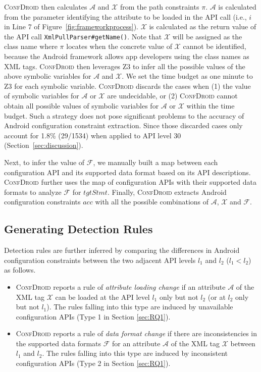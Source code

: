 \textsc{ConfDroid} then calculates $\mathcal{A}$ and $\mathcal{X}$ from the path constraints $\pi$.
$\mathcal{A}$ is calculated from the parameter identifying the attribute to be loaded in the API call (i.e., $i$ in Line 7 of Figure~\ref{fig:frameworkprocess}). 
$\mathcal{X}$ is calculated as the return value of the API call \texttt{XmlPullParser\#getName()}. 
Note that $\mathcal{X}$ will be assigned as the class name where $\pi$ locates when the concrete value of $\mathcal{X}$ cannot be identified, because the Android framework allows app developers using the class names as XML tags.
\textsc{ConfDroid} then leverages Z3 to infer all the possible values of the above symbolic variables for $\mathcal{A}$ and $\mathcal{X}$.
We set the time budget as one minute to Z3 for each symbolic variable.
\textsc{ConfDroid} discards the cases when (1) the value of symbolic variables for $\mathcal{A}$ or $\mathcal{X}$ are undecidable, or (2) \textsc{ConfDroid} cannot obtain all possible values of symbolic variables for $\mathcal{A}$ or $\mathcal{X}$ within the time budget.
Such a strategy does not pose significant problems to the accuracy of Android configuration constraint extraction. Since those discarded cases only account for 1.8\% (29/1534) when applied to API level 30 (Section~\ref{sec:discussion}).

Next, to infer the value of $\mathcal{F}$, we manually built a map between each configuration API and its supported data format based on its API descriptions. \textsc{ConfDroid} further uses the map of configuration APIs with their supported data formats to analyze $\mathcal{F}$ for $tgtStmt$.
Finally, \textsc{ConfDroid} extracts Android configuration constraints $acc$ with all the possible combinations of $\mathcal{A}$, $\mathcal{X}$ and $\mathcal{F}$.

\subsection{Generating Detection Rules}
\label{sec:generate-rule}
Detection rules are further inferred by comparing the differences in Android configuration constraints between the two adjacent API levels $l_1$ and $l_2$ ($l_1<l_2$) as follows.
\begin{itemize}
	\item \textsc{ConfDroid} reports a rule of \textit{attribute loading change} if an attribute $\mathcal{A}$ of the XML tag $\mathcal{X}$ can be loaded at the API level $l_1$ only but not $l_2$ (or at $l_2$ only but not $l_1$).
	The rules falling into this type are induced by unavailable configuration APIs (Type 1 in Section \ref{sec:RQ1}).
	\item \textsc{ConfDroid} reports a rule of \textit{data format change} if there are inconsistencies in the supported data formats $\mathcal{F}$ for an attribute $\mathcal{A}$ of the XML tag $\mathcal{X}$ between $l_1$ and $l_2$.
	The rules falling into this type are induced by inconsistent configuration APIs (Type 2 in Section \ref{sec:RQ1}).
\end{itemize}

